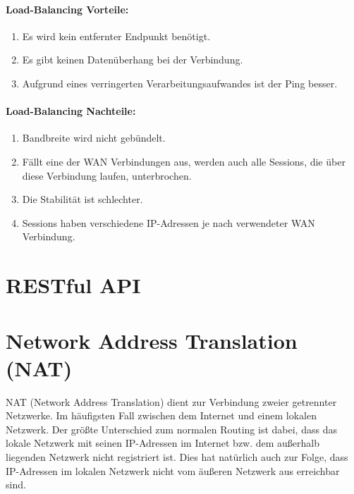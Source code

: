\paragraph{Load-Balancing Vorteile:}
\begin{enumerate}
    \item Es wird kein entfernter Endpunkt benötigt.
    \item Es gibt keinen Datenüberhang bei der Verbindung.
    \item Aufgrund eines verringerten Verarbeitungsaufwandes ist der Ping besser. 
\end{enumerate}
\paragraph{Load-Balancing Nachteile:}
\begin{enumerate}
    \item Bandbreite wird nicht gebündelt.
    \item Fällt eine der WAN Verbindungen aus, werden auch alle Sessions, die über diese Verbindung laufen, unterbrochen.
    \item Die Stabilität ist schlechter.
    \item Sessions haben verschiedene IP-Adressen je nach verwendeter WAN Verbindung.
\end{enumerate}


\section{RESTful API}
\section{Network Address Translation (NAT)}
NAT (Network Address Translation) dient zur Verbindung zweier getrennter Netzwerke. Im häufigsten Fall zwischen dem Internet und einem lokalen Netzwerk. Der größte Unterschied zum normalen Routing ist dabei, dass das lokale Netzwerk mit seinen IP-Adressen im Internet bzw. dem außerhalb liegenden Netzwerk nicht registriert ist. Dies hat natürlich auch zur Folge, dass IP-Adressen im lokalen Netzwerk nicht vom äußeren Netzwerk aus erreichbar sind. 
